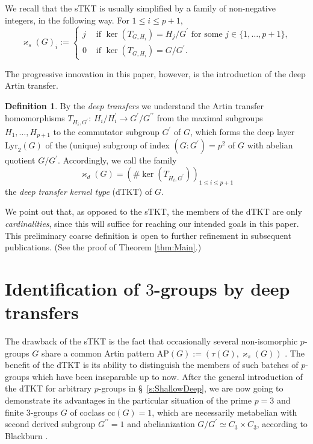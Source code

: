 \documentclass{amsart}
\theoremstyle{definition}
\newtheorem{definition}{Definition}[section]
\numberwithin{equation}{section}
\begin{document}
\noindent
We recall
\cite{Ma2}
that the sTKT is usually simplified
by a family of non-negative integers, in the following way.
For \(1\le i\le p+1\),
\begin{equation}
\label{eqn:ShallowTKT}
\varkappa_s(G)_i:=
\begin{cases}
j & \text{ if } \ker(T_{G,H_i})=H_j/G^\prime \text{ for some } j\in\lbrace 1,\ldots,p+1\rbrace, \\
0 & \text{ if } \ker(T_{G,H_i})=G/G^\prime.
\end{cases}
\end{equation}

\noindent
The progressive innovation in this paper, however,
is the introduction of the deep Artin transfer.

\begin{definition}
\label{dfn:Deep}
By the \textit{deep transfers}
we understand the Artin transfer homomorphisms \(T_{H_i,G^\prime}:\,H_i/H_i^\prime\to G^\prime/G^{\prime\prime}\)
\cite{Ma9}
from the maximal subgroups \(H_1,\ldots,H_{p+1}\) to the commutator subgroup \(G^\prime\) of \(G\),
which forms the deep layer \(\mathrm{Lyr}_2(G)\)
of the (unique) subgroup of index \((G:G^\prime)=p^2\) of \(G\) with abelian quotient \(G/G^\prime\).
Accordingly, we call the family
\begin{equation}
\label{eqn:DeepTKT}
\varkappa_d(G)=(\#\ker(T_{H_i,G^\prime}))_{1\le i\le p+1}
\end{equation}
the \textit{deep transfer kernel type} (dTKT) of \(G\).
\end{definition}

\noindent
We point out that, as opposed to the sTKT, the members of the dTKT are only \textit{cardinalities},
since this will suffice for reaching our intended goals in this paper.
This preliminary coarse definition is open to further refinement in subsequent publications.
(See the proof of Theorem
\ref{thm:Main}.)



\section{Identification of \(3\)-groups by deep transfers}
\label{s:3GroupsDeep}
\noindent
The drawback of the sTKT is the fact that occasionally
several non-isomorphic \(p\)-groups \(G\) share a common Artin pattern \(\mathrm{AP}(G):=(\tau(G),\varkappa_s(G))\)
\cite[Thm. 7.2, p. 158]{Ma11b}.
The benefit of the dTKT is its ability
to distinguish the members of such batches of \(p\)-groups
which have been inseparable up to now.
After the general introduction of the dTKT for arbitrary \(p\)-groups in \S\
\ref{s:ShallowDeep},
we are now going to demonstrate its advantages
in the particular situation of the prime \(p=3\) and finite \(3\)-groups \(G\) of coclass \(\mathrm{cc}(G)=1\),
which are necessarily metabelian with second derived subgroup \(G^{\prime\prime}=1\)
and abelianization \(G/G^\prime\simeq C_3\times C_3\),
according to Blackburn
\cite{Bl1}.
\end{document}
